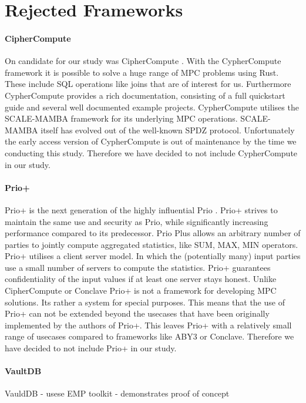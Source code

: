 \section{Rejected Frameworks}
\paragraph{CipherCompute}
On candidate for our study was CipherCompute \cite{Cosmian} . With the CypherCompute framework it is possible to solve a huge range of MPC problems using Rust. These include SQL operations like joins that are of interest for us. Furthermore CypherCompute provides a rich documentation, consisting of a full quickstart guide and several well documented example projects. CypherCompute utilises the SCALE-MAMBA \cite{aly2021scale} framework for its underlying MPC operations. SCALE-MAMBA  itself has evolved out of the well-known SPDZ \cite{SPDZ} protocol. Unfortunately the early access version of CypherCompute is out of maintenance by the time we conducting this study. Therefore we have decided to not include CypherCompute in our study.

\paragraph{Prio+}
Prio+ \cite{cryptoeprint:2021:576} is the next generation of the highly influential Prio \cite{201553}. Prio+ strives to maintain the same use and security as Prio, while significantly increasing performance compared to its predecessor. Prio Plus allows an arbitrary number of parties to jointly compute aggregated statistics, like SUM, MAX, MIN operators. Prio+ utilises a client server model. In which the (potentially many) input parties use a small number of servers to compute the statistics. Prio+ guarantees confidentiality of the input values if at least one server stays honest. Unlike CipherCompute or Conclave Prio+ is not a framework for developing MPC solutions. Its rather a system for special purposes. This means that the use of Prio+ can not be extended beyond the usecases that have been originally implemented by the authors of Prio+. This leaves Prio+ with a relatively small range of usecases compared to frameworks like ABY3 or Conclave. Therefore we have decided to not include Prio+ in our study.

\paragraph{VaultDB}
VauldDB \cite{rogers2022vaultdb} 
- usese EMP toolkit \cite{emp-toolkit}
- demonstrates proof of concept  